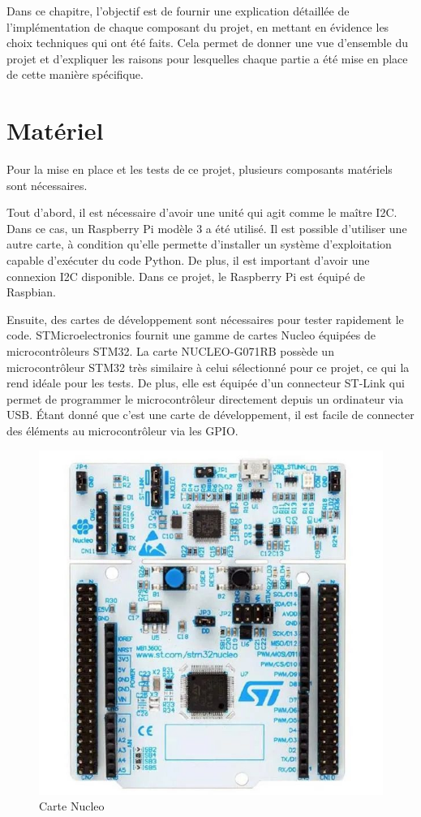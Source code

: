 Dans ce chapitre, l'objectif est de fournir une explication détaillée de l'implémentation de chaque composant du projet, en mettant en évidence les choix techniques qui ont été faits.
Cela permet de donner une vue d'ensemble du projet et d'expliquer les raisons pour lesquelles chaque partie a été mise en place de cette manière spécifique.

\section{Matériel}

Pour la mise en place et les tests de ce projet, plusieurs composants matériels sont nécessaires.

Tout d'abord, il est nécessaire d'avoir une unité qui agit comme le maître I2C.
Dans ce cas, un Raspberry Pi modèle 3 a été utilisé.
Il est possible d'utiliser une autre carte, à condition qu'elle permette d'installer un système d'exploitation capable d'exécuter du code Python.
De plus, il est important d'avoir une connexion I2C disponible.
Dans ce projet, le Raspberry Pi est équipé de Raspbian.

Ensuite, des cartes de développement sont nécessaires pour tester rapidement le code.
STMicroelectronics fournit une gamme de cartes Nucleo équipées de microcontrôleurs STM32.
La carte NUCLEO-G071RB possède un microcontrôleur STM32 très similaire à celui sélectionné pour ce projet, ce qui la rend idéale pour les tests.
De plus, elle est équipée d'un connecteur ST-Link qui permet de programmer le microcontrôleur directement depuis un ordinateur via USB.
Étant donné que c'est une carte de développement, il est facile de connecter des éléments au microcontrôleur via les GPIO.

\begin{figure}[H]
    \centering
    \includegraphics[scale=0.2]{./assets/figures/nucleo.jpg}
    \caption{\cite{nucleo} Carte Nucleo}
\end{figure}


